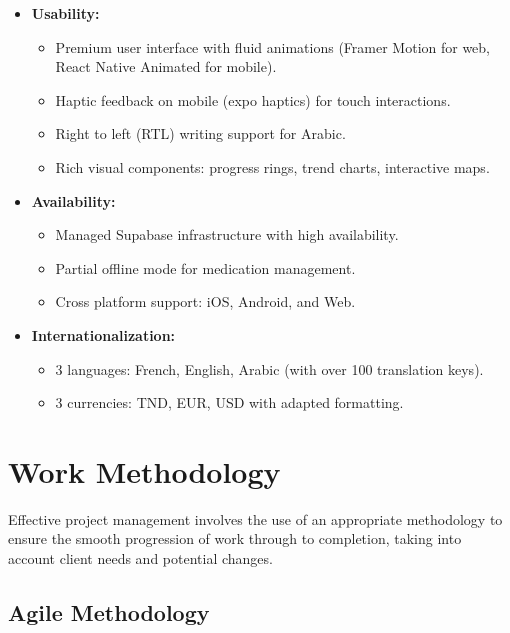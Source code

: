 \documentclass[12pt,a4paper,oneside]{report}
\begin{document}
\begin{itemize}
\begin{itemize}
        \item 7 Zustand stores for state management.
    \end{itemize}
    \item \textbf{Usability:}
    \begin{itemize}
        \item Premium user interface with fluid animations (Framer Motion for web, React Native Animated for mobile).
        \item Haptic feedback on mobile (expo haptics) for touch interactions.
        \item Right to left (RTL) writing support for Arabic.
        \item Rich visual components: progress rings, trend charts, interactive maps.
    \end{itemize}
    \item \textbf{Availability:}
    \begin{itemize}
        \item Managed Supabase infrastructure with high availability.
        \item Partial offline mode for medication management.
        \item Cross platform support: iOS, Android, and Web.
    \end{itemize}
    \item \textbf{Internationalization:}
    \begin{itemize}
        \item 3 languages: French, English, Arabic (with over 100 translation keys).
        \item 3 currencies: TND, EUR, USD with adapted formatting.
    \end{itemize}
\end{itemize}
\endgroup

\section{Work Methodology}

Effective project management involves the use of an appropriate methodology to ensure the smooth progression of work through to completion, taking into account client needs and potential changes.

\subsection{Agile Methodology}
\end{document}
